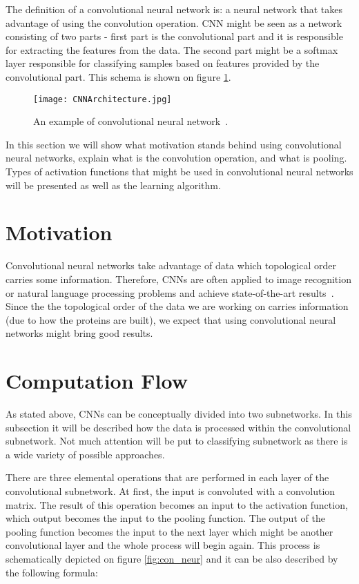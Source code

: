 \documentclass[a4paper,10pt]{report}
\begin{document}
      The definition of a convolutional neural network is: a neural network that takes advantage of using the convolution operation. CNN might be seen as a network consisting of two parts - first part is the convolutional part and it is responsible for extracting the features from the data. The second part might be a softmax layer responsible for classifying samples based on features provided by the convolutional part. This schema is shown on figure \ref{fig:con_network}. 
      
     \begin{figure}[h!]
	  \centering
	  \texttt{[image: CNNArchitecture.jpg]}
	  \caption{An example of convolutional neural network~\cite{CONV_NET}.}
	  \label{fig:con_network}
	\end{figure} 
      
      In this section we will show what motivation stands behind using convolutional neural networks, explain what is the convolution operation, and what is pooling. Types of activation functions that might be used in convolutional neural networks
      will be presented as well as the learning algorithm. 
      
      \section{Motivation}
	Convolutional neural networks take advantage of data which topological order carries some information. Therefore, CNNs are often applied to image recognition or natural language processing problems and achieve state-of-the-art results~\cite{ImageNet, CONV_NLP}. Since the the topological order of the data we are working on carries information (due to how the proteins are built), we expect that using convolutional neural networks might bring good results. 
	
      \section{Computation Flow}
	As stated above, CNNs can be conceptually divided into two subnetworks. In this subsection it will be described how the data is processed within the convolutional subnetwork. Not much attention will be put to classifying subnetwork as there is a wide variety of possible approaches. 
	
	There are three elemental operations that are performed in each layer of the convolutional subnetwork. At first, the input is convoluted with a convolution matrix. The result of this operation becomes an input to the activation function, which output becomes the input to the pooling function. The output of the pooling function becomes the input to the next layer which might be another convolutional layer and the whole process will begin again. This process is schematically depicted on figure \ref{fig:con_neur} and it can be also described by the following formula: 
	
\end{document}

